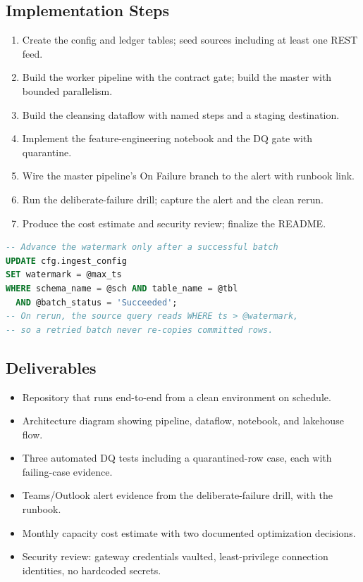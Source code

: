\subsection*{Implementation Steps}
\begin{enumerate}
    \item Create the config and ledger tables; seed sources including at least one REST feed.
    \item Build the worker pipeline with the contract gate; build the master with bounded parallelism.
    \item Build the cleansing dataflow with named steps and a staging destination.
    \item Implement the feature-engineering notebook and the DQ gate with quarantine.
    \item Wire the master pipeline's On Failure branch to the alert with runbook link.
    \item Run the deliberate-failure drill; capture the alert and the clean rerun.
    \item Produce the cost estimate and security review; finalize the README.
\end{enumerate}

\begin{lstlisting}[language=SQL,caption={Milestone 3: watermarks advance only after a successful batch.},label={lst:chapter12-capstone-watermark}]
-- Advance the watermark only after a successful batch
UPDATE cfg.ingest_config
SET watermark = @max_ts
WHERE schema_name = @sch AND table_name = @tbl
  AND @batch_status = 'Succeeded';
-- On rerun, the source query reads WHERE ts > @watermark,
-- so a retried batch never re-copies committed rows.
\end{lstlisting}

\subsection*{Deliverables}
\begin{itemize}
    \item Repository that runs end-to-end from a clean environment on schedule.
    \item Architecture diagram showing pipeline, dataflow, notebook, and lakehouse flow.
    \item Three automated DQ tests including a quarantined-row case, each with failing-case evidence.
    \item Teams/Outlook alert evidence from the deliberate-failure drill, with the runbook.
    \item Monthly capacity cost estimate with two documented optimization decisions.
    \item Security review: gateway credentials vaulted, least-privilege connection identities, no hardcoded secrets.
\end{itemize}

